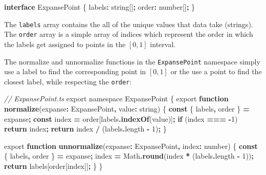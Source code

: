 \documentclass[
]{book}
\newenvironment{Shaded}{\begin{snugshade}}{\end{snugshade}}
\newcommand{\AttributeTok}[1]{\textcolor[rgb]{0.13,0.29,0.53}{#1}}
\newcommand{\BuiltInTok}[1]{#1}
\newcommand{\CommentTok}[1]{\textcolor[rgb]{0.56,0.35,0.01}{\textit{#1}}}
\newcommand{\ControlFlowTok}[1]{\textcolor[rgb]{0.13,0.29,0.53}{\textbf{#1}}}
\newcommand{\DataTypeTok}[1]{\textcolor[rgb]{0.13,0.29,0.53}{#1}}
\newcommand{\DecValTok}[1]{\textcolor[rgb]{0.00,0.00,0.81}{#1}}
\newcommand{\FunctionTok}[1]{\textcolor[rgb]{0.13,0.29,0.53}{\textbf{#1}}}
\newcommand{\ImportTok}[1]{#1}
\newcommand{\KeywordTok}[1]{\textcolor[rgb]{0.13,0.29,0.53}{\textbf{#1}}}
\newcommand{\NormalTok}[1]{#1}
\newcommand{\OperatorTok}[1]{\textcolor[rgb]{0.81,0.36,0.00}{\textbf{#1}}}
\theoremstyle{definition}
\theoremstyle{definition}
\theoremstyle{definition}
\theoremstyle{definition}
\theoremstyle{remark}
\begin{document}
\begin{Shaded}
\begin{Highlighting}[]
\KeywordTok{interface}\NormalTok{ ExpansePoint \{}
\NormalTok{    labels}\OperatorTok{:} \DataTypeTok{string}\NormalTok{[]}\OperatorTok{;}
\NormalTok{    order}\OperatorTok{:} \DataTypeTok{number}\NormalTok{[]}\OperatorTok{;}
\NormalTok{\}}
\end{Highlighting}
\end{Shaded}

The \texttt{labels} array contains the all of the unique values that data take (strings). The \texttt{order} array is a simple array of indices which represent the order in which the labels get assigned to points in the \([0, 1]\) interval.

The normalize and unnormalize functions in the \texttt{ExpansePoint} namespace simply use a label to find the corresponding point in \([0, 1]\) or the use a point to find the closest label, while respecting the \texttt{order}:

\begin{Shaded}
\begin{Highlighting}[]
\CommentTok{// ExpansePoint.ts}
\ImportTok{export} \ImportTok{namespace} \DataTypeTok{ExpansePoint}\NormalTok{ \{}
  \ImportTok{export} \KeywordTok{function} \FunctionTok{normalize}\NormalTok{(expanse}\OperatorTok{:}\NormalTok{ ExpansePoint}\OperatorTok{,}\NormalTok{ value}\OperatorTok{:} \DataTypeTok{string}\NormalTok{) \{}
    \KeywordTok{const}\NormalTok{ \{ labels}\OperatorTok{,}\NormalTok{ order \} }\OperatorTok{=}\NormalTok{ expanse}\OperatorTok{;}
    \KeywordTok{const}\NormalTok{ index }\OperatorTok{=}\NormalTok{ order[labels}\OperatorTok{.}\FunctionTok{indexOf}\NormalTok{(value)]}\OperatorTok{;}
    \ControlFlowTok{if}\NormalTok{ (index }\OperatorTok{===} \OperatorTok{{-}}\DecValTok{1}\NormalTok{) }\ControlFlowTok{return}\NormalTok{ index}\OperatorTok{;}
    \ControlFlowTok{return}\NormalTok{ index }\OperatorTok{/}\NormalTok{ (labels}\OperatorTok{.}\AttributeTok{length} \OperatorTok{{-}} \DecValTok{1}\NormalTok{)}\OperatorTok{;}
\NormalTok{  \}}

  \ImportTok{export} \KeywordTok{function} \FunctionTok{unnormalize}\NormalTok{(expanse}\OperatorTok{:}\NormalTok{ ExpansePoint}\OperatorTok{,}\NormalTok{ index}\OperatorTok{:} \DataTypeTok{number}\NormalTok{) \{}
    \KeywordTok{const}\NormalTok{ \{ labels}\OperatorTok{,}\NormalTok{ order \} }\OperatorTok{=}\NormalTok{ expanse}\OperatorTok{;}
\NormalTok{    index }\OperatorTok{=} \BuiltInTok{Math}\OperatorTok{.}\FunctionTok{round}\NormalTok{(index }\OperatorTok{*}\NormalTok{ (labels}\OperatorTok{.}\AttributeTok{length} \OperatorTok{{-}} \DecValTok{1}\NormalTok{))}\OperatorTok{;}
    \ControlFlowTok{return}\NormalTok{ labels[order[index]]}\OperatorTok{;}
\NormalTok{  \}}
\NormalTok{\}}
\end{Highlighting}
\end{Shaded}
\end{document}
